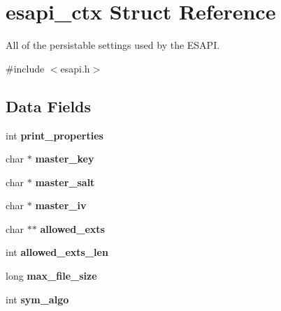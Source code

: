 \hypertarget{structesapi__ctx}{
\section{esapi\_\-ctx Struct Reference}
\label{structesapi__ctx}
}


All of the persistable settings used by the ESAPI.  




{\ttfamily \#include $<$esapi.h$>$}

\subsection*{Data Fields}
\begin{DoxyCompactItemize}
\item 
\hypertarget{structesapi__ctx_a590b3f6e30794c4bc8779698bfa99443}{
int {\bfseries print\_\-properties}}
\label{structesapi__ctx_a590b3f6e30794c4bc8779698bfa99443}

\item 
\hypertarget{structesapi__ctx_a7ce5283ff4153b0203bc40c4909cec3d}{
char $\ast$ {\bfseries master\_\-key}}
\label{structesapi__ctx_a7ce5283ff4153b0203bc40c4909cec3d}

\item 
\hypertarget{structesapi__ctx_a86bcd73a06403bc07063a47d456b514a}{
char $\ast$ {\bfseries master\_\-salt}}
\label{structesapi__ctx_a86bcd73a06403bc07063a47d456b514a}

\item 
\hypertarget{structesapi__ctx_a5230673d0847ed5194248257dc5abe1d}{
char $\ast$ {\bfseries master\_\-iv}}
\label{structesapi__ctx_a5230673d0847ed5194248257dc5abe1d}

\item 
\hypertarget{structesapi__ctx_a29453afb51ba9aab3a830fce9183c25a}{
char $\ast$$\ast$ {\bfseries allowed\_\-exts}}
\label{structesapi__ctx_a29453afb51ba9aab3a830fce9183c25a}

\item 
\hypertarget{structesapi__ctx_a333a6549cfd66965940a9b6b5c0e9b9d}{
int {\bfseries allowed\_\-exts\_\-len}}
\label{structesapi__ctx_a333a6549cfd66965940a9b6b5c0e9b9d}

\item 
\hypertarget{structesapi__ctx_a964c3f53fec25024e94cb685d4ac2610}{
long {\bfseries max\_\-file\_\-size}}
\label{structesapi__ctx_a964c3f53fec25024e94cb685d4ac2610}

\item 
\hypertarget{structesapi__ctx_a58df4571ac40e1cfdf10fbda60fb91a0}{
int {\bfseries sym\_\-algo}}
\label{structesapi__ctx_a58df4571ac40e1cfdf10fbda60fb91a0}


\end{DoxyCompactItemize}
